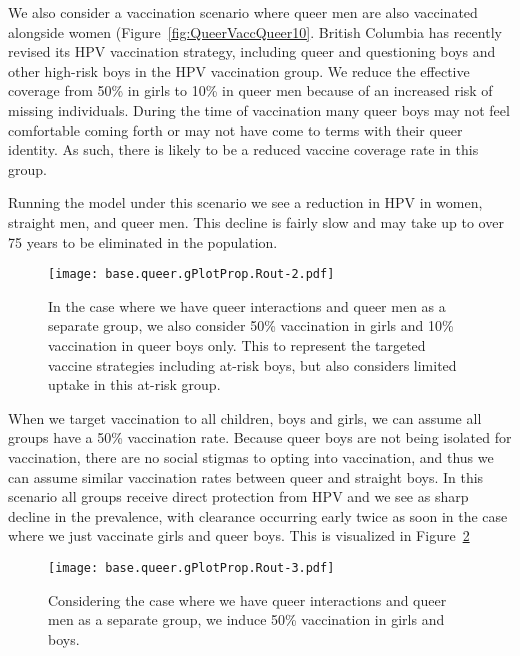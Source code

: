 \documentclass[12pt]{article}
\begin{document}
We also consider a vaccination scenario where queer men are also vaccinated alongside women (Figure~\ref{fig:QueerVaccQueer10}.  British Columbia has recently revised its HPV vaccination strategy, including queer and questioning boys and other high-risk boys in the HPV vaccination group.  We reduce the effective coverage from 50\% in girls to 10\% in queer men because of an increased risk of missing individuals.  During the time of vaccination many queer boys may not feel comfortable coming forth or may not have come to terms with their queer identity.  As such, there is likely to be a reduced vaccine coverage rate in this group.

Running the model under this scenario we see a reduction in HPV in women, straight men, and queer men.  This decline is fairly slow and may take up to over 75 years to be eliminated in the population.  

\begin{figure}[h!]
\begin{center}
\texttt{[image: base.queer.gPlotProp.Rout-2.pdf]}
\caption{In the case where we have queer interactions and queer men as a separate group, we also consider 50\% vaccination in girls and 10\% vaccination in queer boys only.  This to represent the targeted vaccine strategies including at-risk boys, but also considers limited uptake in this at-risk group.}
\label{fig:queerVaccQueer10}
\end{center}
\end{figure}

When we target vaccination to all children, boys and girls, we can assume all groups have a 50\% vaccination rate.  Because queer boys are not being isolated for vaccination, there are no social stigmas to opting into vaccination, and thus we can assume similar vaccination rates between queer and straight boys.  In this scenario all groups receive direct protection from HPV and we see as sharp decline in the prevalence, with clearance occurring early twice as soon in the case where we just vaccinate girls and queer boys.  This is visualized in Figure~\ref{queerVaccAll}

\begin{figure}[h!]
\begin{center}
\texttt{[image: base.queer.gPlotProp.Rout-3.pdf]}
\caption{Considering the case where we have queer interactions and queer men as a separate group, we induce 50\% vaccination in girls and boys.}
\label{queerVaccAll}
\end{center}
\end{figure}
\end{document}
